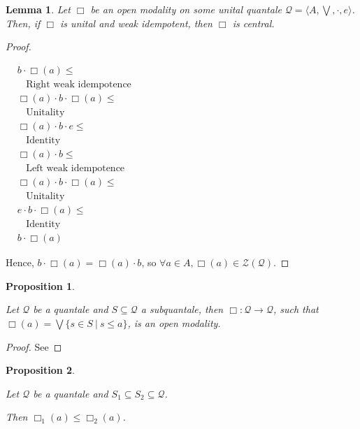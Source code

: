 \documentclass[a4paper]{article}
\theoremstyle{defin}
\theoremstyle{theorem}
\theoremstyle{prop}
\newtheorem{prop}{Proposition}
\theoremstyle{lemma}
\newtheorem{lemma}{Lemma}
\theoremstyle{ex}
\theoremstyle{col}
\begin{document}
\begin{lemma}
  Let $\Box$ be an open modality on some unital quantale $\mathcal{Q} = \langle A, \bigvee, \cdot, e \rangle$.
  Then, if $\Box$ is unital and weak idempotent, then $\Box$ is central.
\end{lemma}

\begin{proof}
$ $

  $\begin{array}{lll}
  & b \cdot \Box(a) \leq & \\
  & \:\:\:\: \text{Right weak idempotence}& \\
  &\Box(a) \cdot b \cdot \Box(a) \leq & \\
  & \:\:\:\: \text{Unitality}& \\
  & \Box(a) \cdot b \cdot e \leq & \\
  & \:\:\:\: \text{Identity}& \\
  &\Box(a) \cdot b \leq & \\
  & \:\:\:\: \text{Left weak idempotence}& \\
  &\Box(a) \cdot b \cdot \Box(a) \leq & \\
  & \:\:\:\: \text{Unitality}& \\
  &e \cdot b \cdot \Box(a) \leq & \\
  & \:\:\:\: \text{Identity}& \\
  &b \cdot \Box(a)&
  \end{array}$

Hence, $b \cdot \Box(a) = \Box(a) \cdot b$, so $\forall a \in A, \Box(a) \in \mathcal{Z}(\mathcal{Q})$.

\end{proof}

\begin{prop}
$ $

  Let $\mathcal{Q}$ be a quantale and $S \subseteq \mathcal{Q}$ a subquantale, then $\Box : \mathcal{Q} \to \mathcal{Q}$, such that
$\Box(a) = \bigvee \{ s \in S \: | \: s \leq a \}$, is an open modality.
\end{prop}

\begin{proof}
  See
\end{proof}

\begin{prop}
$ $

  Let $\mathcal{Q}$ be a quantale and $S_1 \subseteq S_2 \subseteq \mathcal{Q}$.

  Then $\Box_1 (a) \leq \Box_2 (a)$.
\end{prop}
\end{document}
